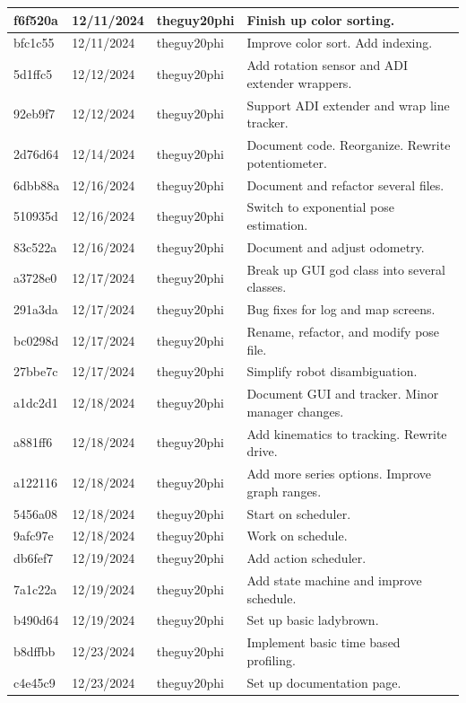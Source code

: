 \begin{center}
\begin{longtable}{|p{28pt}|p{33pt}|p{40pt}|p{300pt}|}
\hline
f6f520a & 12/11/2024 & theguy20phi & Finish up color sorting. \\
\hline
bfc1c55 & 12/11/2024 & theguy20phi & Improve color sort. Add indexing. \\
\hline
5d1ffc5 & 12/12/2024 & theguy20phi & Add rotation sensor and ADI extender wrappers. \\
\hline
92eb9f7 & 12/12/2024 & theguy20phi & Support ADI extender and wrap line tracker. \\
\hline
2d76d64 & 12/14/2024 & theguy20phi & Document code. Reorganize. Rewrite potentiometer. \\
\hline
6dbb88a & 12/16/2024 & theguy20phi & Document and refactor several files. \\
\hline
510935d & 12/16/2024 & theguy20phi & Switch to exponential pose estimation. \\
\hline
83c522a & 12/16/2024 & theguy20phi & Document and adjust odometry. \\
\hline
a3728e0 & 12/17/2024 & theguy20phi & Break up GUI god class into several classes. \\
\hline
291a3da & 12/17/2024 & theguy20phi & Bug fixes for log and map screens. \\
\hline
bc0298d & 12/17/2024 & theguy20phi & Rename, refactor, and modify pose file. \\
\hline
27bbe7c & 12/17/2024 & theguy20phi & Simplify robot disambiguation. \\
\hline
a1dc2d1 & 12/18/2024 & theguy20phi & Document GUI and tracker. Minor manager changes. \\
\hline
a881ff6 & 12/18/2024 & theguy20phi & Add kinematics to tracking. Rewrite drive. \\
\hline
a122116 & 12/18/2024 & theguy20phi & Add more series options. Improve graph ranges. \\
\hline
5456a08 & 12/18/2024 & theguy20phi & Start on scheduler. \\
\hline
9afc97e & 12/18/2024 & theguy20phi & Work on schedule. \\
\hline
db6fef7 & 12/19/2024 & theguy20phi & Add action scheduler. \\
\hline
7a1c22a & 12/19/2024 & theguy20phi & Add state machine and improve schedule. \\
\hline
b490d64 & 12/19/2024 & theguy20phi & Set up basic ladybrown. \\
\hline
b8dffbb & 12/23/2024 & theguy20phi & Implement basic time based profiling. \\
\hline
c4e45c9 & 12/23/2024 & theguy20phi & Set up documentation page. \\

\end{longtable}
\end{center}
